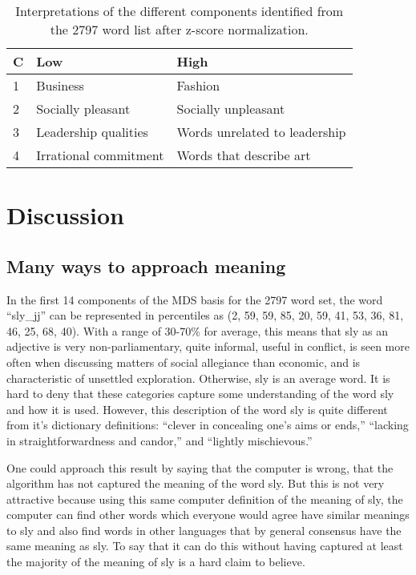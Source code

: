 \begin{table}[tbp]
\begin{tabular}{ | l |p{2in}|p{2in}|}
 \hline
 C & Low & High \\
 \hline
 1 & Business & Fashion \\
 2 & Socially pleasant & Socially unpleasant \\
 3 & Leadership qualities & Words unrelated to leadership \\
 4 & Irrational commitment & Words that describe art \\
 \hline
\end{tabular}
 \caption{Interpretations of the different components identified from the 
 2797 word list after z-score normalization.}
 \label{tab:2797zscoreinterp}
\end{table}

\chapter{Discussion}

\section{Many ways to approach meaning}

In the first 14 components of the MDS basis for the 2797 word set, the word
``sly\_jj'' can be represented in percentiles as (2, 59, 59, 85, 20, 59, 41, 
53, 36, 81, 46, 25, 68, 40). With a range of 30-70\% for average, this means 
that sly as an adjective is very non-parliamentary, quite informal, useful in 
conflict, is seen more often when discussing matters of social allegiance than
economic, and is characteristic of unsettled exploration. Otherwise, sly is an
average word. It is hard to deny that these categories capture some 
understanding of the word sly and how it is used. However, this description of
the word sly is quite different from it's dictionary definitions: 
``clever in concealing one's aims or ends,'' ``lacking in straightforwardness 
and candor,'' and ``lightly mischievous.'' \citep{SlyMerriamWebster2014}

One could approach this result by saying that the computer is wrong, that the
algorithm has not captured the meaning of the word sly. But this is not very
attractive because using this same computer definition of the meaning of sly,
the computer can find other words which everyone would agree have similar 
meanings to sly and also find words in other languages that by general 
consensus have the same meaning as sly. To say that it can do this without
having captured at least the majority of the meaning of sly is a hard claim
to believe. 

